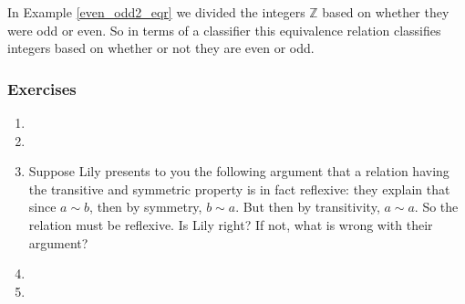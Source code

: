 \begin{example}\label{mod2_classes_eqr}
In Example \ref{even_odd2_eqr} we divided the integers $\mathbb{Z}$ based on whether they were odd or even. So in terms of a classifier this equivalence relation classifies integers based on whether or not they are even or odd.
\end{example}

\subsubsection{Exercises}

\begin{enumerate}
	\item 
	\item 
	\item Suppose Lily presents to you the following argument that a relation having the transitive and symmetric property is in fact reflexive: they explain that since $a \sim b$, then by symmetry, $b \sim a$. But then by transitivity, $a \sim a$. So the relation must be reflexive. Is Lily right? If not, what is wrong with their argument? 
	\item 
	\item 
\end{enumerate}